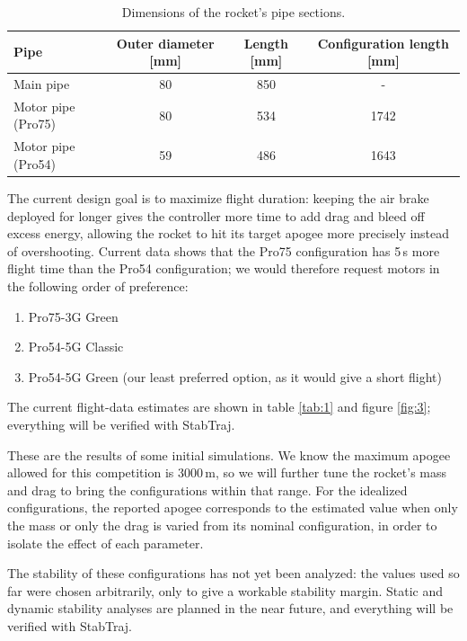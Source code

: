 \begin{table}[ht]
    \centering
    \caption{Dimensions of the rocket's pipe sections.}
    \label{tab:pipes}
    \begin{tabular}{lccc}
        \hline
        Pipe & Outer diameter [mm] & Length [mm] & Configuration length [mm] \\
        \hline
        Main pipe & 80 & 850 & - \\
        Motor pipe (Pro75) & 80 & 534 & 1742 \\
        Motor pipe (Pro54) & 59 & 486 & 1643 \\
        \hline
    \end{tabular}
\end{table}

The current design goal is to maximize flight duration: keeping the air brake deployed for longer gives the controller more time to add drag and bleed off excess energy, allowing the rocket to hit its target apogee more precisely instead of overshooting.
Current data shows that the Pro75 configuration has 5\,s more flight time than the Pro54 configuration; we would therefore request motors in the following order of preference:
\begin{enumerate}
    \item Pro75-3G Green
    \item Pro54-5G Classic
    \item Pro54-5G Green (our least preferred option, as it would give a short flight)
\end{enumerate}

The current flight-data estimates are shown in table \ref{tab:1} and figure \ref{fig:3}; everything will be verified with StabTraj.

These are the results of some initial simulations. We know the maximum apogee allowed for this competition is 3000\,m, so we will further tune the rocket's mass and drag to bring the configurations within that range.
For the idealized configurations, the reported apogee corresponds to the estimated value when only the mass or only the drag is varied from its nominal configuration, in order to isolate the effect of each parameter.

The stability of these configurations has not yet been analyzed: the values used so far were chosen arbitrarily, only to give a workable stability margin. Static and dynamic stability analyses are planned in the near future, and everything will be verified with StabTraj.

